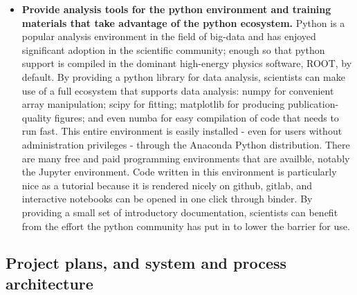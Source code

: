 \begin{itemize}
    \item \textbf{Provide analysis tools for the python environment and training materials that take advantage of the python ecosystem.}  Python is a popular analysis environment in the field of big-data and has enjoyed significant adoption in the scientific community; enough so that python support is compiled in the dominant high-energy physics software, ROOT, by default.  By providing a python library for data analysis, scientists can make use of a full ecosystem that supports data analysis: numpy for convenient array manipulation; scipy for fitting; matplotlib for producing publication-quality figures; and even numba for easy compilation of code that needs to run fast.  This entire environment is easily installed - even for users without administration privileges - through the Anaconda Python distribution.  There are many free and paid programming environments that are availble, notably the Jupyter environment.  Code written in this environment is particularly nice as a tutorial because it is rendered nicely on github, gitlab, and interactive notebooks can be opened in one click through binder.  By providing a small set of introductory documentation, scientists can benefit from the effort the python community has put in to lower the barrier for use.
    
\end{itemize}

\subsection{Project plans, and system and process architecture}


